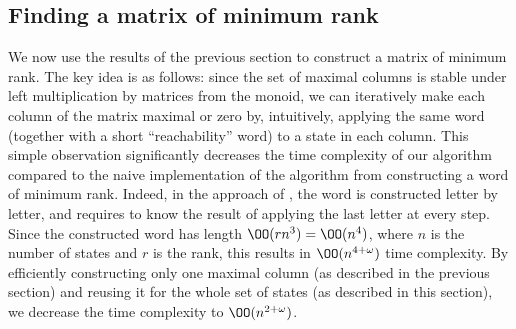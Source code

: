 \subsection{Finding a matrix of minimum rank}\label{subsec-finding-mat}

We now use the results of the previous section to construct a matrix of minimum rank. The key idea is as follows: since the set of maximal columns is stable under left multiplication by matrices from the monoid, we can iteratively make each column of the matrix maximal or zero by, intuitively, applying the same word (together with a short ``reachability'' word) to a state in each column. This simple observation significantly decreases the time complexity of our algorithm compared to the naive implementation of the algorithm from \cite{Carpi1988} constructing a word of minimum rank. Indeed, in the approach of \cite{Carpi1988}, the word is constructed letter by letter, and requires to know the result of applying the last letter at every step. Since the constructed word has length $\OO(rn^3) = \OO(n^4)$, where $n$ is the number of states and $r$ is the rank, this results in $\OO(n^{4+\omega})$ time complexity. By efficiently constructing only one maximal column (as described in the previous section) and reusing it for the whole set of states (as described in this section), we decrease the time complexity to $\OO(n^{2+\omega})$.

